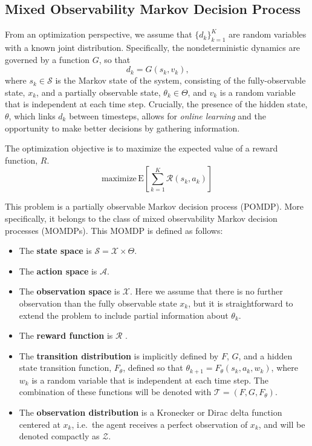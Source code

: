 \documentclass{article}
\newcommand{\sspace}{\ensuremath{\mathcal{S}} }
\newcommand{\aspace}{\ensuremath{\mathcal{A}} }
\newcommand{\tdist}{\ensuremath{\mathcal{T}} }
\newcommand{\odist}{\ensuremath{\mathcal{Z}} }
\newcommand{\reward}{\ensuremath{\mathcal{R}} }
\begin{document}


\subsection{Mixed Observability Markov Decision Process} \label{sec:momdp}

From an optimization perspective, we assume that $\{d_k\}_{k=1}^K$ are random variables with a known joint distribution. Specifically, the nondeterministic dynamics are governed by a function $G$, so that
\begin{equation}
    d_k = G(s_k, v_k) \text{,}
\end{equation}
where $s_k \in \sspace$ is the Markov state of the system, consisting of the fully-observable state, $x_k$, and a partially observable state, $\theta_k \in \Theta$, and $v_k$ is a random variable that is independent at each time step.
Crucially, the presence of the hidden state, $\theta$, which links $d_k$ between timesteps, allows for \emph{online learning} and the opportunity to make better decisions by gathering information.

The optimization objective is to maximize the expected value of a reward function, $R$.
\begin{equation}
    \text{maximize}\, \text{E} \left[ \sum_{k=1}^K \reward(s_k, a_k) \right]
    \label{eq:pomdpobj}
\end{equation}

This problem is a partially observable Markov decision process (POMDP).
More specifically, it belongs to the class of mixed observability Markov decision processes (MOMDPs).
This MOMDP is defined as follows:

\begin{itemize}
    \item The \textbf{state space} is $\sspace = \mathcal{X} \times \Theta$.
    \item The \textbf{action space} is $\aspace$.
    \item The \textbf{observation space} is $\mathcal{X}$. Here we assume that there is no further observation than the fully observable state $x_k$, but it is straightforward to extend the problem to include partial information about $\theta_k$.
    \item The \textbf{reward function} is \reward.
    \item The \textbf{transition distribution} is implicitly defined by $F$, $G$, and a hidden state transition function, $F_\theta$, defined so that $\theta_{k+1} = F_\theta(s_k, a_k, w_k)$, where $w_k$ is a random variable that is independent at each time step. The combination of these functions will be denoted with $\tdist = (F, G, F_\theta)$.
    \item The \textbf{observation distribution} is a Kronecker or Dirac delta function centered at $x_k$, i.e.\ the agent receives a perfect observation of $x_k$, and will be denoted compactly as $\odist$.
\end{itemize}
\end{document}
